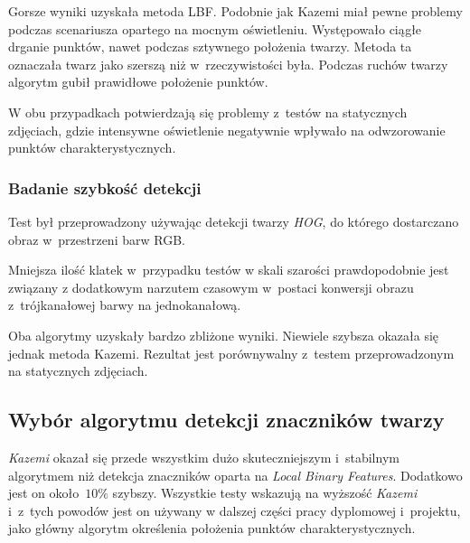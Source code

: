 \par

Gorsze wyniki uzyskała metoda LBF. Podobnie jak Kazemi miał pewne problemy podczas scenariusza opartego na mocnym oświetleniu. Występowało ciągłe drganie punktów, nawet podczas sztywnego położenia twarzy. Metoda ta oznaczała twarz jako szerszą niż w~rzeczywistości była. Podczas ruchów twarzy algorytm gubił prawidłowe położenie punktów.

\par

W obu przypadkach potwierdzają się problemy z~testów na statycznych zdjęciach, gdzie intensywne oświetlenie negatywnie wpływało na odwzorowanie punktów charakterystycznych. 

\subsubsection{Badanie szybkość detekcji} \label{section:facemark_speed_live}

Test był przeprowadzony używając detekcji twarzy \textit{HOG}, do którego dostarczano obraz w~przestrzeni barw RGB. 



Mniejsza ilość klatek w~przypadku testów w skali szarości prawdopodobnie jest związany z dodatkowym narzutem czasowym w~postaci konwersji obrazu z~trójkanałowej barwy na jednokanałową.

\par

Oba algorytmy uzyskały bardzo zbliżone wyniki. Niewiele szybsza okazała się jednak metoda Kazemi. Rezultat jest porównywalny z~testem przeprowadzonym na statycznych zdjęciach.





\subsection{Wybór algorytmu detekcji znaczników twarzy}

\textit{Kazemi} okazał się przede wszystkim dużo skuteczniejszym i~stabilnym algorytmem niż detekcja znaczników oparta na \textit{Local Binary Features}. Dodatkowo jest on około~$10\%$ szybszy. Wszystkie testy wskazują na wyższość \textit{Kazemi} i~z~tych powodów jest on używany w dalszej części pracy dyplomowej i~projektu, jako główny algorytm określenia położenia punktów charakterystycznych. 
